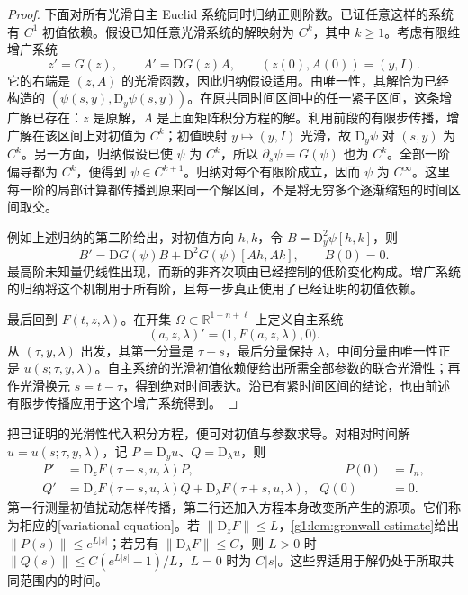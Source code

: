 \begin{proof}
	下面对所有光滑自主 Euclid 系统同时归纳正则阶数。已证任意这样的系统有 \(C^1\) 初值依赖。假设已知任意光滑系统的解映射为 \(C^k\)，其中 \(k\geq1\)。考虑有限维增广系统
	\[
		z'=G(z),\qquad A'=\mathrm{D}G(z)A,
		\qquad (z(0),A(0))=(y,I).
	\]
	它的右端是 \((z,A)\) 的光滑函数，因此归纳假设适用。由唯一性，其解恰为已经构造的 \((\psi(s,y),\mathrm{D}_y\psi(s,y))\)。在原共同时间区间中的任一紧子区间，这条增广解已存在：\(z\) 是原解，\(A\) 是上面矩阵积分方程的解。利用前段的有限步传播，增广解在该区间上对初值为 \(C^k\)；初值映射 \(y\mapsto(y,I)\) 光滑，故 \(\mathrm{D}_y\psi\) 对 \((s,y)\) 为 \(C^k\)。另一方面，归纳假设已使 \(\psi\) 为 \(C^k\)，所以 \(\partial_s\psi=G(\psi)\) 也为 \(C^k\)。全部一阶偏导都为 \(C^k\)，便得到 \(\psi\in C^{k+1}\)。归纳对每个有限阶成立，因而 \(\psi\) 为 \(C^\infty\)。这里每一阶的局部计算都传播到原来同一个解区间，不是将无穷多个逐渐缩短的时间区间取交。

	例如上述归纳的第二阶给出，对初值方向 \(h,k\)，令 \(B=\mathrm{D}_y^2\psi[h,k]\)，则
	\[
		B'=\mathrm{D}G(\psi)B+\mathrm{D}^2G(\psi)[Ah,Ak],\qquad B(0)=0.
	\]
	最高阶未知量仍线性出现，而新的非齐次项由已经控制的低阶变化构成。增广系统的归纳将这个机制用于所有阶，且每一步真正使用了已经证明的初值依赖。

	最后回到 \(F(t,z,\lambda)\)。在开集 \(\Omega\subset\mathbb R^{1+n+\ell}\) 上定义自主系统
	\[
		(a,z,\lambda)'=\bigl(1,F(a,z,\lambda),0\bigr).
	\]
	从 \((\tau,y,\lambda)\) 出发，其第一分量是 \(\tau+s\)，最后分量保持 \(\lambda\)，中间分量由唯一性正是 \(u(s;\tau,y,\lambda)\)。自主系统的光滑初值依赖便给出所需全部参数的联合光滑性；再作光滑换元 \(s=t-\tau\)，得到绝对时间表达。沿已有紧时间区间的结论，也由前述有限步传播应用于这个增广系统得到。
\end{proof}

把已证明的光滑性代入积分方程，便可对初值与参数求导。对相对时间解 \(u=u(s;\tau,y,\lambda)\)，记 \(P=\mathrm{D}_yu\)、\(Q=\mathrm{D}_\lambda u\)，则
\begin{equation}
	\label{g1:eq:ode-variational-equation}
	\begin{aligned}
		P'&=\mathrm{D}_zF(\tau+s,u,\lambda)P,&\qquad P(0)&=I_n,\\
		Q'&=\mathrm{D}_zF(\tau+s,u,\lambda)Q+\mathrm{D}_\lambda F(\tau+s,u,\lambda),& Q(0)&=0.
	\end{aligned}
\end{equation}
第一行测量初值扰动怎样传播，第二行还加入方程本身改变所产生的源项。它们称为相应的[variational equation]。若 \(\|\mathrm{D}_zF\|\leq L\)，\cref{g1:lem:gronwall-estimate}给出 \(\|P(s)\|\leq e^{L|s|}\)；若另有 \(\|\mathrm{D}_\lambda F\|\leq C\)，则 \(L>0\) 时 \(\|Q(s)\|\leq C(e^{L|s|}-1)/L\)，\(L=0\) 时为 \(C|s|\)。这些界适用于解仍处于所取共同范围内的时间。

